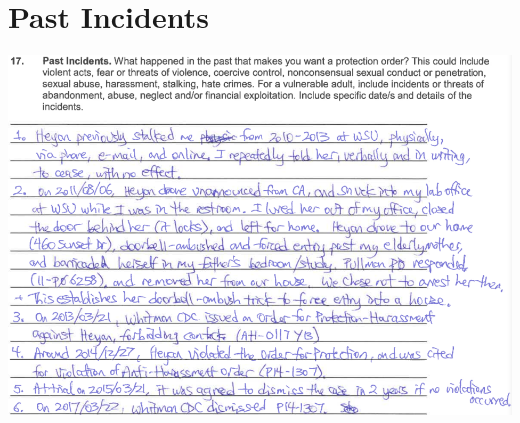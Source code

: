 \documentclass[9pt, b5paper]{article}
\begin{document}
\section{Past Incidents}
\label{sec-4}

\includegraphics[width=.9\linewidth]{./pic/dearCousin_20220919_183625.png}
\end{document}
